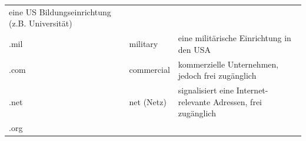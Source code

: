\documentclass[]{book}
\theoremstyle{definition}
\theoremstyle{definition}
\theoremstyle{definition}
\theoremstyle{remark}
\begin{document}
\begin{longtable}[]{@{}lll@{}}
\begin{minipage}[t]{0.56\columnwidth}
eine US Bildungseinrichtung (z.B. Universität) \vspace{5mm}\strut
\end{minipage}\tabularnewline
\begin{minipage}[t]{0.23\columnwidth}\raggedright\strut
.mil \vspace{5mm}\strut
\end{minipage} & \begin{minipage}[t]{0.13\columnwidth}\raggedright\strut
military \vspace{5mm}\strut
\end{minipage} & \begin{minipage}[t]{0.56\columnwidth}\raggedright\strut
eine militärische Einrichtung in den USA \vspace{5mm}\strut
\end{minipage}\tabularnewline
\begin{minipage}[t]{0.23\columnwidth}\raggedright\strut
.com \vspace{5mm}\strut
\end{minipage} & \begin{minipage}[t]{0.13\columnwidth}\raggedright\strut
commercial \vspace{5mm}\strut
\end{minipage} & \begin{minipage}[t]{0.56\columnwidth}\raggedright\strut
kommerzielle Unternehmen, jedoch frei zugänglich \vspace{5mm}\strut
\end{minipage}\tabularnewline
\begin{minipage}[t]{0.23\columnwidth}\raggedright\strut
.net\vspace{5mm}\strut
\end{minipage} & \begin{minipage}[t]{0.13\columnwidth}\raggedright\strut
net (Netz) \vspace{5mm}\strut
\end{minipage} & \begin{minipage}[t]{0.56\columnwidth}\raggedright\strut
signalisiert eine Internet-relevante Adressen, frei zugänglich
\vspace{5mm}\strut
\end{minipage}\tabularnewline
\begin{minipage}[t]{0.23\columnwidth}\raggedright\strut
.org \vspace{5mm}\strut
\end{minipage} & \begin{minipage}[t]{0.13\columnwidth}\raggedright\strut

\end{minipage}
\end{longtable}
\end{document}
